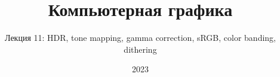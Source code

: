 \documentclass[10pt]{beamer}
\title{Компьютерная графика}
\subtitle{Лекция 11: HDR, tone mapping, gamma correction, sRGB, color banding, dithering}
\date{2023}
\newcommand{\slideimage}[1]{
  \begin{figure}
    \begin{adjustbox}{width=\textwidth, totalheight=\textheight-2\baselineskip-2\baselineskip,keepaspectratio}
      \texttt{[image: \#1]}
    \end{adjustbox}
  \end{figure}
}
\begin{document}
\frame{\titlepage}



\end{document}
